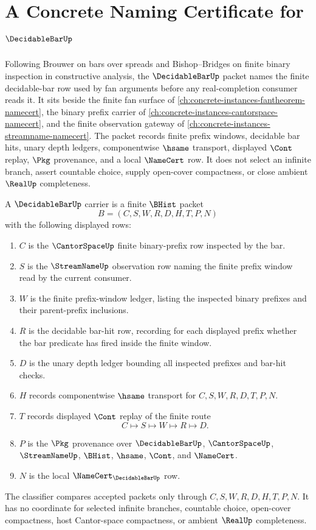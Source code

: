 \chapter{A Concrete Naming Certificate for $\DecidableBarUp$}
\label{ch:concrete-instances-decidable-bar-namecert}

Following Brouwer on bars over spreads and Bishop--Bridges on finite binary
inspection in constructive analysis, the $\DecidableBarUp$ packet names the
finite decidable-bar row used by fan arguments before any real-completion
consumer reads it. It sits beside the finite fan surface of
\autoref{ch:concrete-instances-fantheorem-namecert}, the binary prefix carrier
of \autoref{ch:concrete-instances-cantorspace-namecert}, and the finite
observation gateway of \autoref{ch:concrete-instances-streamname-namecert}.
The packet records finite prefix windows, decidable bar hits, unary depth
ledgers, componentwise $\hsame$ transport, displayed $\Cont$ replay, $\Pkg$
provenance, and a local $\NameCert$ row. It does not select an infinite branch,
assert countable choice, supply open-cover compactness, or close ambient
$\RealUp$ completeness.

\begin{definition}
\label{def:decidable-bar-carrier}
A $\DecidableBarUp$ carrier is a finite $\BHist$ packet
$$
B=(C,S,W,R,D,H,T,P,N)
$$
with the following displayed rows:
\begin{enumerate}
\item $C$ is the $\CantorSpaceUp$ finite binary-prefix row inspected by the bar.
\item $S$ is the $\StreamNameUp$ observation row naming the finite prefix window
read by the current consumer.
\item $W$ is the finite prefix-window ledger, listing the inspected binary
prefixes and their parent-prefix inclusions.
\item $R$ is the decidable bar-hit row, recording for each displayed prefix
whether the bar predicate has fired inside the finite window.
\item $D$ is the unary depth ledger bounding all inspected prefixes and bar-hit
checks.
\item $H$ records componentwise $\hsame$ transport for $C,S,W,R,D,T,P,N$.
\item $T$ records displayed $\Cont$ replay of the finite route
$$
C \longmapsto S \longmapsto W \longmapsto R \longmapsto D .
$$
\item $P$ is the $\Pkg$ provenance over $\DecidableBarUp$, $\CantorSpaceUp$,
$\StreamNameUp$, $\BHist$, $\hsame$, $\Cont$, and $\NameCert$.
\item $N$ is the local $\NameCert_{\DecidableBarUp}$ row.
\end{enumerate}
The classifier compares accepted packets only through $C,S,W,R,D,H,T,P,N$. It
has no coordinate for selected infinite branches, countable choice, open-cover
compactness, host Cantor-space compactness, or ambient $\RealUp$ completeness.
\end{definition}

